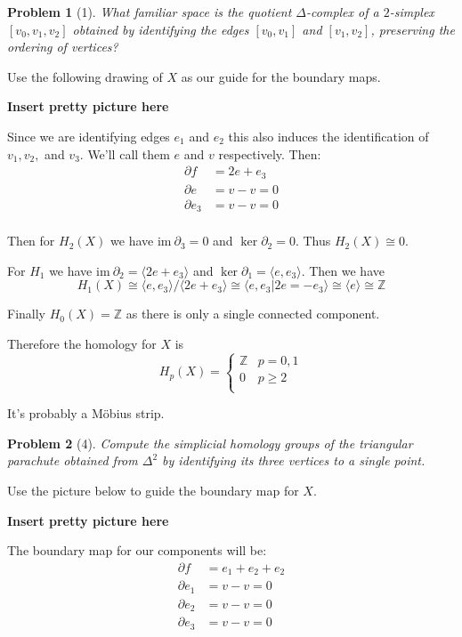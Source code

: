 \documentclass[10pt]{article}
\newcommand{\sk}{\vskip 10mm}
\newcommand{\bb}[1]{\mathbb{#1}}
\newcommand{\ima}{\mathrm{im}\ }
\theoremstyle{plain}
\newtheorem{problem}{Problem}
\theoremstyle{remark}
\begin{document}
\begin{problem}[1]
  What familiar space is the quotient $\Delta$-complex of a $2$-simplex
  $[v_0,v_1,v_2]$ obtained by identifying the edges $[v_0,v_1]$ and
  $[v_1,v_2]$, preserving the ordering of vertices?
\end{problem}

Use the following drawing of $X$ as our guide for the boundary maps.

\textbf{Insert pretty picture here}

Since we are identifying edges $e_1$ and $e_2$ this also induces the
identification of $v_1,v_2,$ and $v_3$. We'll call them $e$
and $v$ respectively. Then:
\begin{align*}
  \partial f &= 2e+e_3\\
  \partial e &= v-v = 0\\
  \partial e_3 &= v-v = 0\\
\end{align*}

Then for $H_2(X)$ we have $\ima \partial_3=0$ and $\ker \partial_2 = 0$.
Thus $H_2(X)\cong 0$.

For $H_1$ we have $\ima \partial_2=\langle 2e+e_3\rangle$ and $\ker\partial_1=\langle e,e_3\rangle$.
Then we have
\[ H_1(X)\cong\langle e,e_3\rangle/\langle 2e+e_3\rangle\cong\langle e,e_3|2e=-e_3\rangle\cong\langle e\rangle\cong \bb{Z}\]

Finally $H_0(X)=\bb{Z}$ as there is only a single connected component.

Therefore the homology for $X$ is
\[
  H_p(X)=
  \left\{
    \begin{array}{ll}
      \bb{Z} & p=0,1\\
      0 & p\geq 2\\
    \end{array}
  \right.
\]

It's probably a M\"obius strip.

\sk

\begin{problem}[4]
  Compute the simplicial homology groups of the triangular parachute
  obtained from $\Delta^2$ by identifying its three vertices to a single point.
\end{problem}

Use the picture below to guide the boundary map for $X$.

\textbf{Insert pretty picture here}

The boundary map for our components will be:
\begin{align*}
  \partial f &= e_1+e_2+e_2\\
  \partial e_1 &= v-v=0\\
  \partial e_2 &= v-v=0\\
  \partial e_3 &= v-v=0\\
\end{align*}
\end{document}
